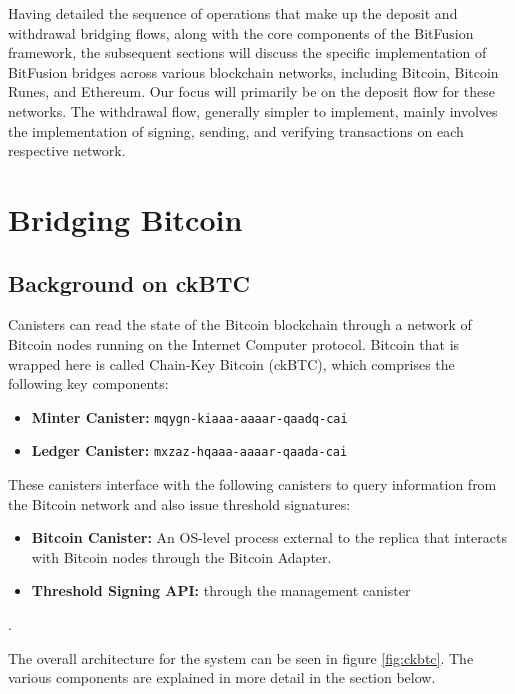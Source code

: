 \documentclass{article}
\begin{document}
Having detailed the sequence of operations that make up the deposit and withdrawal bridging flows, along with the core components of the BitFusion framework, the subsequent sections will discuss the specific implementation of BitFusion bridges across various blockchain networks, including Bitcoin, Bitcoin Runes, and Ethereum. Our focus will primarily be on the deposit flow for these networks. The withdrawal flow, generally simpler to implement, mainly involves the implementation of signing, sending, and verifying transactions on each respective network.


\section{Bridging Bitcoin}
\subsection{Background on ckBTC}
Canisters can read the state of the Bitcoin blockchain through a network of Bitcoin nodes running on the Internet Computer protocol. Bitcoin that is wrapped here is called Chain-Key Bitcoin (ckBTC), which comprises the following key components:

\begin{itemize}
\item \textbf{Minter Canister:} \texttt{mqygn-kiaaa-aaaar-qaadq-cai}
\item \textbf{Ledger Canister:} \texttt{mxzaz-hqaaa-aaaar-qaada-cai}
\end{itemize}

These canisters interface with the following canisters to query information from the Bitcoin network and also issue threshold signatures:

\begin{itemize}
\item \textbf{Bitcoin Canister:} An OS-level process external to the replica that interacts with Bitcoin nodes through the Bitcoin Adapter. 
\item \textbf{Threshold Signing API:}  through the management canister
\end{itemize}.

The overall architecture for the system can be seen in figure \ref{fig:ckbtc}. The various components are explained in more detail in the section below. 
\end{document}
